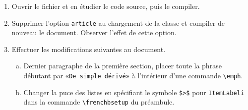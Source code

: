 \begin{frame}[plain,fragile=singleslide]
  \begin{exercice}
    \begin{enumerate}
    \item Ouvrir le fichier  et en
      étudier le code source, puis le compiler.
    \item Supprimer l'option \texttt{article} au chargement de la
      classe et compiler de nouveau le document. Observer l'effet de
      cette option.
    \item Effectuer les modifications suivantes au document.
      \begin{enumerate}[a)]
      \item Dernier paragraphe de la première section, placer toute la
        phrase débutant par \texttt{«De simple dérivé»} à l'intérieur
        d'une commande \texttt{{\textbackslash}emph}.
      \item Changer la puce des listes en spécifiant le symbole
        \texttt{\$>\$} pour \verb=ItemLabeli= dans la commande
        \verb=\frenchbsetup= du préambule.
      \end{enumerate}
    \end{enumerate}
  \end{exercice}
\end{frame}


